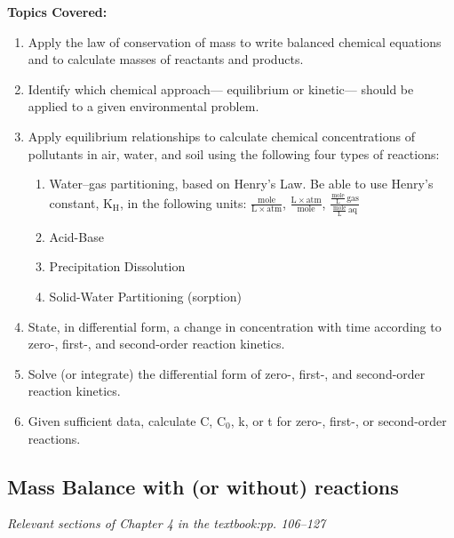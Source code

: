 \documentclass[12pt,letterpaper]{article}
\begin{document}
\textbf{Topics Covered:}\\

\begin{enumerate}
\item Apply the law of conservation of mass to write balanced chemical equations and to calculate masses of reactants and products.
\item Identify which chemical approach--- equilibrium or kinetic--- should be applied to a given environmental problem.
\item Apply equilibrium relationships to calculate chemical concentrations of pollutants in air, water, and soil using the following four types of reactions: 
\begin{enumerate}
\item Water--gas partitioning, based on Henry's Law.  Be able to use Henry's constant, K$\mathrm{_H}$, in the following units: $\mathrm{\frac{mole}{L\times atm}}$, $\mathrm{\frac{L\times atm}{mole}}$, $\mathrm{\frac{\frac{mole}{L}\, gas}{\frac{mole}{L}\, aq}}$
\item Acid-Base
\item Precipitation Dissolution
\item Solid-Water Partitioning (sorption)
\end{enumerate}
\item State, in differential form, a change in concentration with time according to zero-, first-, and second-order reaction kinetics.
\item Solve (or integrate) the differential form of zero-, first-, and second-order reaction kinetics.
\item Given sufficient data, calculate C, C$_0$, k, or t for zero-, first-, or second-order reactions. 

\end{enumerate}

\subsection *{Mass Balance with (or without) reactions}

\emph{Relevant sections of Chapter 4 in the textbook:pp. 106--127}\\
\end{document}
